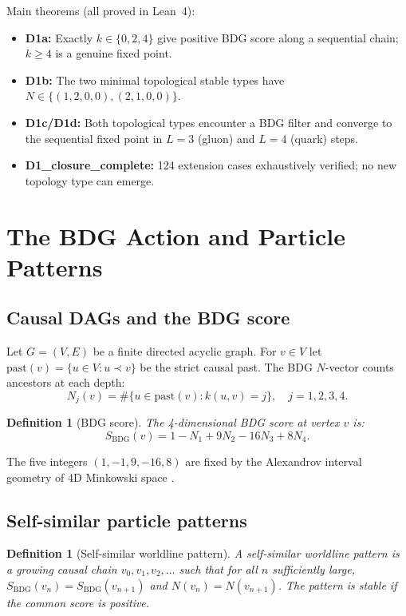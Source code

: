 \documentclass[11pt,a4paper]{article}
\newtheorem{definition}[theorem]{Definition}
\newcommand{\SBDG}{S_{\mathrm{BDG}}}
\begin{document}
Main theorems (all proved in Lean~4):
\begin{itemize}
\item \textbf{D1a:} Exactly $k\in\{0,2,4\}$ give positive BDG score along a sequential chain; $k\geq4$ is a genuine fixed point.
\item \textbf{D1b:} The two minimal topological stable types have $N\in\{(1,2,0,0),(2,1,0,0)\}$.
\item \textbf{D1c/D1d:} Both topological types encounter a BDG filter and converge to the sequential fixed point in $L=3$ (gluon) and $L=4$ (quark) steps.
\item \textbf{D1\_closure\_complete:} 124 extension cases exhaustively verified; no new topology type can emerge.
\end{itemize}

\section{The BDG Action and Particle Patterns}

\subsection{Causal DAGs and the BDG score}

Let $G=(V,E)$ be a finite directed acyclic graph.  For $v\in V$ let $\mathrm{past}(v) = \{u\in V: u\prec v\}$ be the strict causal past.  The BDG $N$-vector counts ancestors at each depth:
\[
N_j(v) = \#\{u\in\mathrm{past}(v): k(u,v)=j\}, \quad j=1,2,3,4.
\]

\begin{definition}[BDG score]
The 4-dimensional BDG score at vertex $v$ is:
\[
\SBDG(v) = 1 - N_1 + 9N_2 - 16N_3 + 8N_4.
\]
\end{definition}
The five integers $(1,-1,9,-16,8)$ are fixed by the Alexandrov interval geometry of 4D Minkowski space \citep{Benincasa2010}.

\subsection{Self-similar particle patterns}

\begin{definition}[Self-similar worldline pattern]
A self-similar worldline pattern is a growing causal chain $v_0,v_1,v_2,\ldots$ such that for all $n$ sufficiently large, $\SBDG(v_n)=\SBDG(v_{n+1})$ and $N(v_n)=N(v_{n+1})$.
The pattern is \emph{stable} if the common score is positive.
\end{definition}
\end{document}

